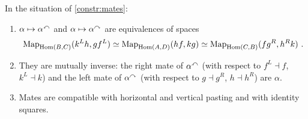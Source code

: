 \begin{lem}
\label{lem:mate-correspondence}
%
In the situation of \cref{constr:mates}:
\begin{enumerate}
\item
$\alpha \mapsto {\alpha}^{\curvearrowleft}$
and
$\alpha \mapsto {\alpha}^{\curvearrowright}$
are equivalences of spaces
\begin{equation*}
\operatorname{Map}_{\operatorname{Hom}(B,C)}(k^{L}h,gf^{L}) \simeq \operatorname{Map}_{\operatorname{Hom}(A,D)}(hf,kg) \simeq
\operatorname{Map}_{\operatorname{Hom}(C,B)}(fg^{R},h^{R}k) \ .
\end{equation*}
\item They are mutually inverse: the right mate of ${\alpha}^{\curvearrowleft}$ (with
respect to $f^{L} \dashv f$, $k^{L} \dashv k$) and the left mate of
${\alpha}^{\curvearrowright}$ (with respect to $g \dashv g^{R}$,
$h \dashv h^{R}$) are $\alpha$.
\item Mates are compatible with horizontal and vertical pasting and with
identity squares.
\end{enumerate}
\end{lem}

